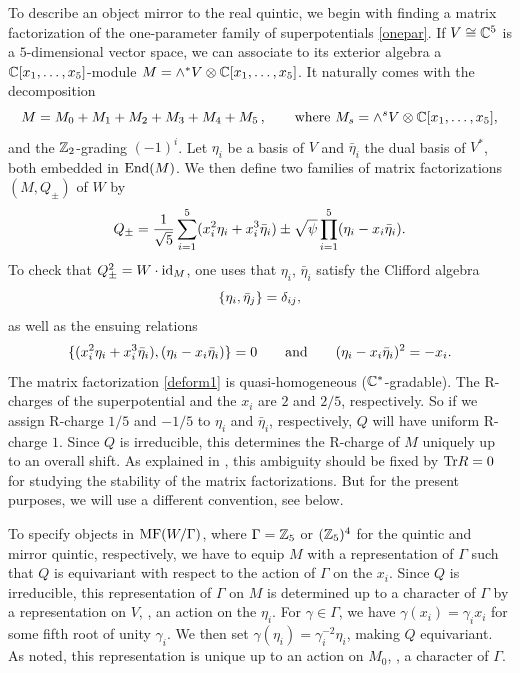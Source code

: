 To describe an object mirror to the real quintic, we begin with finding a
matrix factorization of the one-parameter family of superpotentials \eqref{onepar}.
If $V\cong {\mathbb C}^5$ is a $5$-dimensional vector space, we can associate to 
its exterior algebra a ${\mathbb C}[x_1,\ldots,x_5]$-module $M=\wedge^* V\otimes
{\mathbb C}[x_1,\ldots,x_5]$. It naturally comes with the decomposition
\begin{equation}
\eqlabel{decomp}
M = M_0+M_1+M_2+M_3+M_4+M_5\,, \qquad \text{where $M_s=\wedge^sV\otimes 
\complex[x_1,\ldots,x_5]$} ,
\end{equation}
and the ${\mathbb Z}_2$-grading $(-1)^i$. Let $\eta_i$ be a basis of $V$ and 
$\bar\eta_i$ the dual basis of $V^*$, both embedded in ${\rm End}(M)$. We 
then define two families of matrix factorizations $(M,Q_{\pm})$ of $W$ by
\begin{equation}
\eqlabel{deform1}
Q_{\pm} = \frac{1}{\sqrt{5}}
\sum_{i=1}^5 (x_i^2\eta_i+x_i^3\bar\eta_i) \pm \sqrt{\psi} 
\prod_{i=1}^5 (\eta_i -x_i\bar \eta_i) .
\end{equation}
To check that $Q_\pm^2=W\cdot {\rm id}_M$, one uses that $\eta_i$,
$\bar\eta_i$ satisfy the Clifford algebra
\begin{equation}
\eqlabel{clifford}
\{\eta_i,\bar\eta_j\} = \delta_{ij} ,
\end{equation}
as well as the ensuing relations
\begin{equation}
\{(x_i^2\eta_i + x_i^3\bar\eta_i),(\eta_i-x_i\bar\eta_i)\} = 0 
\qquad
{\rm and}
\qquad
(\eta_i-x_i\bar\eta_i)^2 = -x_i .
\end{equation}
The matrix factorization \eqref{deform1} is quasi-homogeneous (${\mathbb C}^*$-gradable). 
The R-charges of the superpotential and the $x_i$ are $2$ and $2/5$, respectively. So
if we assign R-charge $1/5$ and $-1/5$ to $\eta_i$ and $\bar\eta_i$, respectively,
$Q$ will have uniform R-charge $1$. Since $Q$ is irreducible, this determines the 
R-charge of $M$ uniquely up to an overall shift. As explained in \cite{stability},
this ambiguity should be fixed by ${\rm Tr} R=0$ for studying the stability of 
the matrix factorizations. But for the present purposes, we will use a different
convention, see below.

To specify objects in ${\rm MF}(W/\Gamma)$, where $\Gamma={\mathbb Z}_5$ or $({\mathbb Z}_5)^4$
for the quintic and mirror quintic, respectively, we have to equip $M$ with
a representation of $\Gamma$ such that $Q$ is equivariant with respect to the 
action of $\Gamma$ on the $x_i$. Since $Q$ is irreducible, this representation
of $\Gamma$ on $M$ is determined up to a character of $\Gamma$ by a representation 
on $V$, \ie, an action on the $\eta_i$. For $\gamma\in\Gamma$, we have $\gamma(x_i) 
= \gamma_i x_i$ for some fifth root of unity $\gamma_i$. We then set $\gamma(\eta_i)=
\gamma_i^{-2} \eta_i$, making $Q$ equivariant. As noted, this representation is
unique up to an action on $M_0$, \ie, a character of $\Gamma$.

